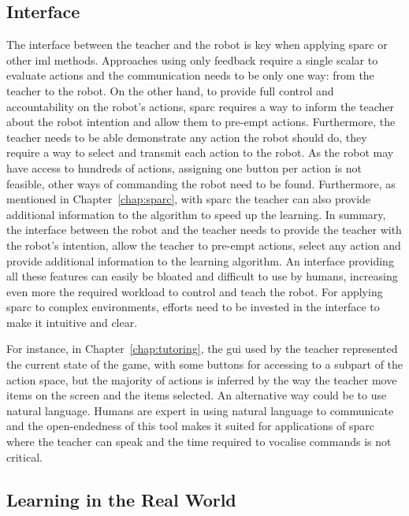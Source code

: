 \subsection{Interface}

The interface between the teacher and the robot is key when applying \gls{sparc} or other \gls{iml} methods. Approaches using only feedback require a single scalar to evaluate actions and the communication needs to be only one way: from the teacher to the robot. On the other hand, to provide full control and accountability on the robot's actions, \gls{sparc} requires a way to inform the teacher about the robot intention and allow them to pre-empt actions. Furthermore, the teacher needs to be able demonstrate any action the robot should do, they require a way to select and transmit each action to the robot. As the robot may have access to hundreds of actions, assigning one button per action is not feasible, other ways of commanding the robot need to be found. Furthermore, as mentioned in Chapter~\ref{chap:sparc}, with \gls{sparc} the teacher can also provide additional information to the algorithm to speed up the learning. In summary, the interface between the robot and the teacher needs to provide the teacher with the robot's intention, allow the teacher to pre-empt actions, select any action and provide additional information to the learning algorithm. An interface providing all these features can easily be bloated and difficult to use by humans, increasing even more the required workload to control and teach the robot. For applying \gls{sparc} to complex environments, efforts need to be invested in the interface to make it intuitive and clear. 

For instance, in Chapter~\ref{chap:tutoring}, the \gls{gui} used by the teacher represented the current state of the game, with some buttons for accessing to a subpart of the action space, but the majority of actions is inferred by the way the teacher move items on the screen and the items selected. An alternative way could be to use natural language. Humans are expert in using natural language to communicate and the open-endedness of this tool makes it suited for applications of \gls{sparc} where the teacher can speak and the time required to vocalise commands is not critical.

\subsection{Learning in the Real World}

